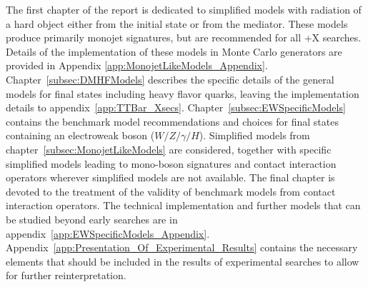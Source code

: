 The first chapter of the report is dedicated to simplified
models with radiation of a hard object either from the initial state
or from the mediator. These models produce primarily monojet signatures, 
but are recommended for all \MET{}+X searches.
Details of the implementation of these models in
Monte Carlo generators are provided in
Appendix \ref{app:MonojetLikeModels_Appendix}.
Chapter~\ref{subsec:DMHFModels} describes the specific details of the general models
for final states including heavy flavor quarks, leaving the implementation
details to appendix~\ref{app:TTBar_Xsecs}.  
Chapter~\ref{subsec:EWSpecificModels} contains the benchmark model
recommendations and choices for final states containing an electroweak 
boson ($W/Z/\gamma/H$). 
Simplified models from chapter~\ref{subsec:MonojetLikeModels}
are considered, together with specific simplified models leading to mono-boson signatures
and contact interaction operators wherever simplified models are not available. 
The final chapter is devoted to the treatment of the validity of benchmark
models from contact interaction operators.
The technical implementation and further models that can be studied
beyond early searches are in appendix~\ref{app:EWSpecificModels_Appendix}. 
Appendix~\ref{app:Presentation_Of_Experimental_Results} contains the necessary elements that
should be included in the results of experimental searches to allow for further reinterpretation. 




